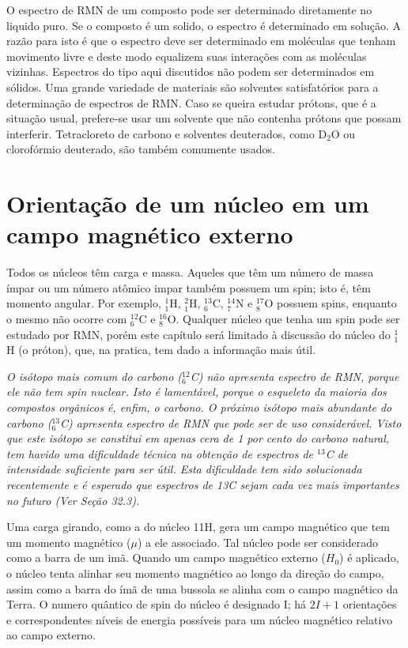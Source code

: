 O espectro de RMN de um composto pode ser determinado diretamente no liquido puro. Se o composto é um solido, o espectro é determinado em solução. A razão para isto é que o espectro deve ser determinado em moléculas que tenham movimento livre e deste modo equalizem suas interações com as moléculas vizinhas. Espectros do tipo aqui discutidos não podem ser determinados em sólidos. Uma grande variedade de materiais são solventes satisfatórios para a determinação de espectros de RMN. Caso se queira estudar prótons, que é a situação usual, prefere-se usar um solvente que não contenha prótons que possam interferir. Tetracloreto de carbono e solventes deuterados, como D$_{2}$O ou clorofórmio deuterado, são também comumente usados.

\section{Orientação de um núcleo em um campo magnético externo}

Todos os núcleos têm carga e massa. Aqueles que têm um número de massa ímpar ou um número atômico impar também possuem um spin; isto é, têm momento angular. Por exemplo, $^1_1$H, $^2_1$H, $^{13}_6$C, $^{14}_7$N e $^{17}_8$O possuem spins, enquanto o mesmo não ocorre com $^{12}_6$C e $^{16}_8$O. Qualquer núcleo que tenha um spin pode ser estudado por RMN, porém este capítulo será limitado à discussão do núcleo do $^1_1$H (o próton), que, na pratica, tem dado a informação mais útil.

\emph{O isótopo mais comum do carbono ($^{12}_6$C) não apresenta espectro de RMN, porque ele não tem spin nuclear. Isto é lamentável, porque o esqueleto da maioria dos compostos orgânicos é, enfim, o carbono. O próximo isótopo mais abundante do carbono ($^{13}_6$C) apresenta espectro de RMN que pode ser de uso considerável. Visto que este isótopo se constitui em apenas cera de 1 por cento do carbono natural, tem havido uma dificuldade técnica na obtenção de espectros de $^{13}$C de intensidade suficiente para ser útil. Esta dificuldade tem sido solucionada recentemente e é esperado que espectros de 13C sejam cada vez mais importantes no futuro (Ver Seção 32.3).}

Uma carga girando, como a do núcleo 11H, gera um campo magnético que tem um momento magnético ($\mu$) a ele associado. Tal núcleo pode ser considerado como a barra de um imã. Quando um campo magnético externo ($H_0$) é aplicado, o núcleo tenta alinhar seu momento magnético ao longo da direção do campo, assim como a barra do ímã de uma bussola se alinha com o campo magnético da Terra. O numero quântico de spin do núcleo é designado I; há $2I + 1$ orientações e correspondentes níveis de energia possíveis para um núcleo magnético relativo ao campo externo.

